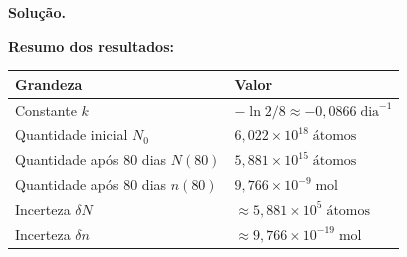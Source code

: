 \documentclass[12pt,a4paper]{article}
\theoremstyle{definition}
\newenvironment{solucao}{%
  \par\medskip\noindent\textbf{Solu\c{c}\~ao.}\quad\ignorespaces
}{%
  \par\medskip
}
\begin{document}
\begin{solucao}
\medskip
\noindent\textbf{Resumo dos resultados:}
\begin{center}
\begin{tabular}{ll}
\hline
\textbf{Grandeza} & \textbf{Valor} \\
\hline
Constante $k$                         & $-\ln 2/8 \approx -0{,}0866\;\text{dia}^{-1}$ \\
Quantidade inicial $N_0$              & $6{,}022\times 10^{18}\;\text{\'atomos}$ \\
Quantidade ap\'os 80 dias $N(80)$     & $5{,}881\times 10^{15}\;\text{\'atomos}$ \\
Quantidade ap\'os 80 dias $n(80)$     & $9{,}766\times 10^{-9}\;\text{mol}$ \\
Incerteza $\delta N$                  & $\approx 5{,}881\times 10^{5}\;\text{\'atomos}$ \\
Incerteza $\delta n$                  & $\approx 9{,}766\times 10^{-19}\;\text{mol}$ \\
\hline
\end{tabular}
\end{center}

\end{solucao}
\end{document}
